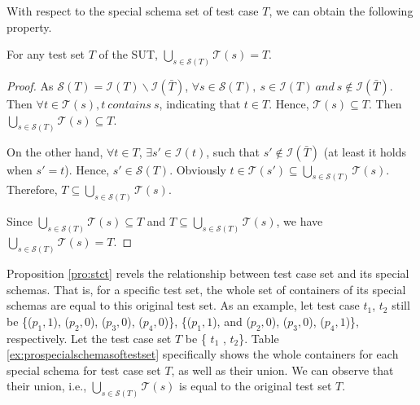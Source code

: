 With respect to the special schema set of test case $T$, we can obtain the following property.

\begin{proposition}\label{pro:stct}
For any test set $T$ of the SUT,  $\bigcup_{s \in \mathcal{S}(T)}\mathcal{T}(s) = T$.
\end{proposition}
\begin{proof}
As $\mathcal{S}(T) =  \mathcal{I}(T) \backslash \mathcal{I}(\bar{T}) $,  $\forall s \in \mathcal{S}(T),\ s \in \mathcal{I}(T)\ and\ s \not\in \mathcal{I}(\bar{T})$. Then $\forall t \in \mathcal{T}(s), t \ contains\ s$, indicating that $t \in T$.  Hence, $\mathcal{T}(s) \subseteq T$.  Then $\bigcup_{s \in \mathcal{S}(T)}\mathcal{T}(s) \subseteq T$.

On the other hand, $\forall t \in T$,  $\exists s' \in \mathcal{I}(t)$, such that $s' \not\in \mathcal{I}(\bar{T})$ (at least it holds when $s' = t$). Hence, $s' \in \mathcal{S}(T)$.  Obviously $t \in \mathcal{T}(s') \subseteq \bigcup_{s \in \mathcal{S}(T)} \mathcal{T}(s)$. Therefore,  $ T \subseteq \bigcup_{s \in \mathcal{S}(T)}\mathcal{T}(s)$.

Since $\bigcup_{s \in \mathcal{S}(T)}\mathcal{T}(s) \subseteq T$ and $T \subseteq \bigcup_{s \in \mathcal{S}(T)}\mathcal{T}(s)$, we have $\bigcup_{s \in \mathcal{S}(T)}\mathcal{T}(s) =  T$.
\end{proof}


Proposition \ref{pro:stct} revels the relationship between test case set and its special schemas. That is, for a specific test set, the whole set of containers of its special schemas are equal to this original test set. As an example,
 let test case $t_{1}$, $t_{2}$  still be \{($p_{1}, 1$), ($p_{2}, 0$), ($p_{3}, 0$), ($p_{4}, 0$)\}, \{($p_{1}, 1$), and ($p_{2}, 0$), ($p_{3}, 0$), ($p_{4}, 1$)\}, respectively. Let the test case set $T$ be \{ $t_{1}$ , $t_{2}$\}.  Table \ref{ex:prospecialschemasoftestset} specifically shows the whole containers for each special schema for test case set $T$, as well as their union. We can observe that their union, i.e.,  $\bigcup_{s \in \mathcal{S}(T)}\mathcal{T}(s)$ is equal to the original test set $T$.

